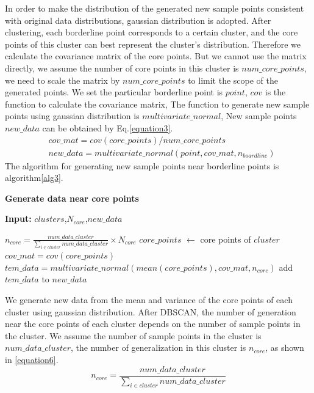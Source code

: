 \documentclass[ida]{iosart2x}
\begin{document}
In order to make the distribution of the generated new sample points 
consistent with original data distributions,
gaussian distribution is adopted.
After clustering, each borderline point corresponds to a certain cluster, 
and the core points of this cluster can best represent the cluster's distribution.
Therefore we calculate the covariance matrix of the core points. 
But we cannot use the matrix directly, we 
assume the number of core points in this cluster is $num\_core\_points$,
we need to scale the matrix by $num\_core\_points$ to limit 
the scope of the generated points.
We set the particular borderline point is $point$, 
$cov$ is the function to calculate the covariance matrix,
The function to generate new sample points using 
gaussian distribution is $multivariate\_normal$,
New sample points $new\_data$ can be obtained by Eq.\ref{equation3}.
\begin{equation}
  \label{equation3}
  \begin{aligned}
      & cov\_mat=cov(core\_points)/num\_core\_points \\
      & new\_data=multivariate\_normal(point,cov\_mat,n_{boardline})
  \end{aligned}
\end{equation}
The algorithm for generating new sample points near borderline points is algorithm\ref{alg3}.

\textbf{Generate data near core points}
\begin{algorithm}[tb]
  \caption{$generate\_core$}
  \label{alg4}
  \hspace*{0.02in} {\bf Input:} $clusters$,$N_{core}$,$new\_data$
  \begin{algorithmic}
    \State $n_{core}=\frac{num\_data\_cluster}{\sum_{i \in cluster} num\_data\_cluster} \times N_{core}$
    \State $core\_points$ $\leftarrow$ core points of $cluster$
    \State $cov\_mat=cov(core\_points)$
    \State $tem\_data=multivariate\_normal(mean(core\_points),cov\_mat,n_{core})$
    \State add $tem\_data$ to $new\_data$
  \EndFor
  \end{algorithmic}
\end{algorithm}
We generate new data from the mean and variance of the 
core points of each cluster using gaussian distribution.
After DBSCAN, 
the number of generation near the core points of each cluster depends 
on the number of sample points in the cluster.
We assume the number of sample points in the cluster is $num\_data\_cluster$, 
 the number of generalization in this cluster is $n_{core}$, as shown in \ref{equation6}.
 \begin{equation}
  \label{equation6}
  n_{core}=\frac{num\_data\_cluster}{\sum_{i \in cluster} num\_data\_cluster}
\end{equation}
  
\end{document}
